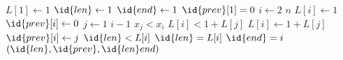 \begin{codebox}
\li $L[1] \gets 1$
\li $\id{len} \gets 1$
\li $\id{end} \gets 1$
\li $\id{prev}[1] = 0$
\li \For $i \gets 2$ \To $n$
\li \Do
		$L[i] \gets 1$
\li		$\id{prev}[i] \gets 0$
\li		\For $j \gets 1$ \To $i-1$
\li		\Do
			\If $x_j < x_i$
\li			\Then
				\If $L[i] < 1 + L[j]$
\li				\Then
					$L[i] \gets 1 + L[j]$
\li					$\id{prev}[i] \gets j$
				\End
			\End
		\End
\li		\If $\id{len} < L[i]$
\li		\Then
			$\id{len} = L[i]$
\li			$\id{end} = i$
		\End
	\End
\li \Return $(\id{len}, \id{prev}, \id{len}end)$
\end{codebox}